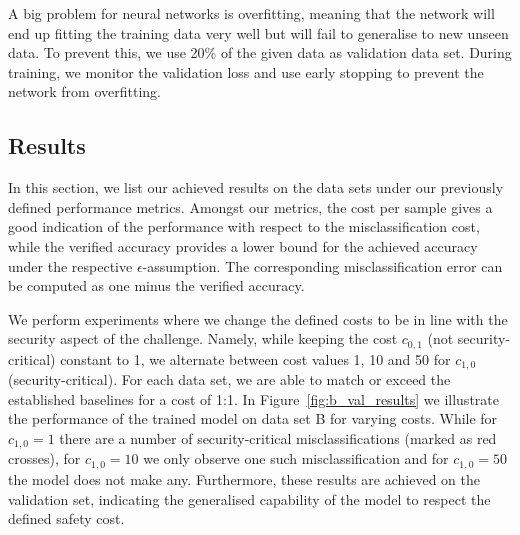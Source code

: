 \documentclass[acmsmall,nonacm]{acmart}
\begin{document}
A big problem for neural networks is overfitting, meaning that the network will end up fitting the training data very well but will fail to generalise to new unseen data. To prevent this, we use 20\% of the given data as validation data set. During training, we monitor the validation loss and use early stopping to prevent the network from overfitting. 

\subsection{Results}
In this section, we list our achieved results on the data sets under our previously defined performance metrics. Amongst our metrics, the cost per sample gives a good indication of the performance with respect to the misclassification cost, while the verified accuracy provides a lower bound for the achieved accuracy under the respective $\epsilon$-assumption. The corresponding misclassification error can be computed as one minus the verified accuracy.

We perform experiments where we change the defined costs to be in line with the security aspect of the challenge. Namely, while keeping the cost $c_{0, 1}$ (not security-critical) constant to 1, we alternate between cost values 1, 10 and 50 for $c_{1, 0}$ (security-critical). For each data set, we are able to match or exceed the established baselines for a cost of 1:1. In Figure~\ref{fig:b_val_results} we illustrate the performance of the trained model on data set B for varying costs. While for $c_{1, 0} = 1$ there are a number of security-critical misclassifications (marked as red crosses), for $c_{1, 0} = 10$ we only observe one such misclassification and for $c_{1, 0} = 50$ the model does not make any. Furthermore, these results are achieved on the validation set, indicating the generalised capability of the model to respect the defined safety cost. 
\end{document}
